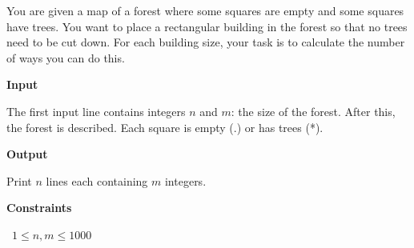 You are given a map of a forest where some squares are empty and some squares have trees.
You want to place a rectangular building in the forest so that no trees need to be cut down. For each building size, your task is to calculate the number of ways you can do this.

\vspace{0.3cm}\noindent\textbf{Input}

The first input line contains integers $n$ and $m$: the size of the forest.
After this, the forest is described. Each square is empty (.) or has trees (*).

\vspace{0.3cm}\noindent\textbf{Output}

Print $n$ lines each containing $m$ integers.

\vspace{0.3cm}\noindent\textbf{Constraints}

\textbullet\ $1 \le n,m \le 1000$